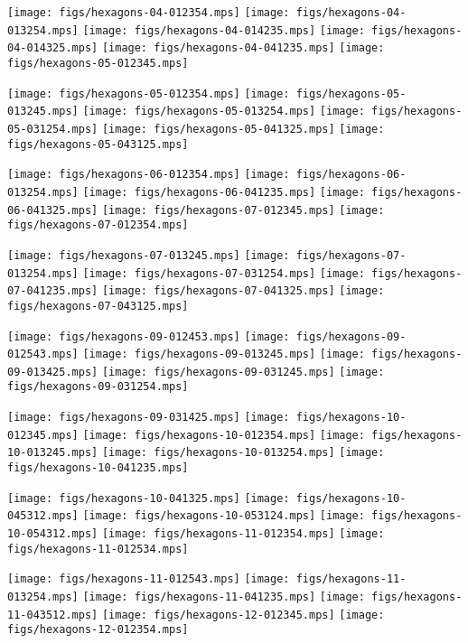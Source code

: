 

\noindent
\texttt{[image: figs/hexagons-04-012354.mps]}
\texttt{[image: figs/hexagons-04-013254.mps]}
\texttt{[image: figs/hexagons-04-014235.mps]}
\texttt{[image: figs/hexagons-04-014325.mps]}
\texttt{[image: figs/hexagons-04-041235.mps]}
\texttt{[image: figs/hexagons-05-012345.mps]}

\noindent
\texttt{[image: figs/hexagons-05-012354.mps]}
\texttt{[image: figs/hexagons-05-013245.mps]}
\texttt{[image: figs/hexagons-05-013254.mps]}
\texttt{[image: figs/hexagons-05-031254.mps]}
\texttt{[image: figs/hexagons-05-041325.mps]}
\texttt{[image: figs/hexagons-05-043125.mps]}

\noindent
\texttt{[image: figs/hexagons-06-012354.mps]}
\texttt{[image: figs/hexagons-06-013254.mps]}
\texttt{[image: figs/hexagons-06-041235.mps]}
\texttt{[image: figs/hexagons-06-041325.mps]}
\texttt{[image: figs/hexagons-07-012345.mps]}
\texttt{[image: figs/hexagons-07-012354.mps]}

\noindent
\texttt{[image: figs/hexagons-07-013245.mps]}
\texttt{[image: figs/hexagons-07-013254.mps]}
\texttt{[image: figs/hexagons-07-031254.mps]}
\texttt{[image: figs/hexagons-07-041235.mps]}
\texttt{[image: figs/hexagons-07-041325.mps]}
\texttt{[image: figs/hexagons-07-043125.mps]}

\noindent
\texttt{[image: figs/hexagons-09-012453.mps]}
\texttt{[image: figs/hexagons-09-012543.mps]}
\texttt{[image: figs/hexagons-09-013245.mps]}
\texttt{[image: figs/hexagons-09-013425.mps]}
\texttt{[image: figs/hexagons-09-031245.mps]}
\texttt{[image: figs/hexagons-09-031254.mps]}

\noindent
\texttt{[image: figs/hexagons-09-031425.mps]}
\texttt{[image: figs/hexagons-10-012345.mps]}
\texttt{[image: figs/hexagons-10-012354.mps]}
\texttt{[image: figs/hexagons-10-013245.mps]}
\texttt{[image: figs/hexagons-10-013254.mps]}
\texttt{[image: figs/hexagons-10-041235.mps]}

\noindent
\texttt{[image: figs/hexagons-10-041325.mps]}
\texttt{[image: figs/hexagons-10-045312.mps]}
\texttt{[image: figs/hexagons-10-053124.mps]}
\texttt{[image: figs/hexagons-10-054312.mps]}
\texttt{[image: figs/hexagons-11-012354.mps]}
\texttt{[image: figs/hexagons-11-012534.mps]}

\noindent
\texttt{[image: figs/hexagons-11-012543.mps]}
\texttt{[image: figs/hexagons-11-013254.mps]}
\texttt{[image: figs/hexagons-11-041235.mps]}
\texttt{[image: figs/hexagons-11-043512.mps]}
\texttt{[image: figs/hexagons-12-012345.mps]}
\texttt{[image: figs/hexagons-12-012354.mps]}


